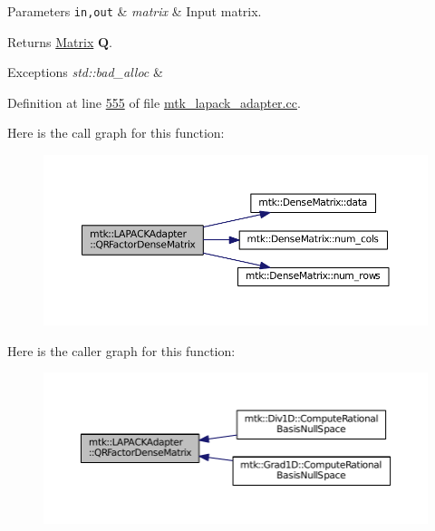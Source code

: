 \begin{DoxyParams}[1]{Parameters}
\mbox{\tt in,out}  & {\em matrix} & Input matrix.\\
\hline
\end{DoxyParams}
\begin{DoxyReturn}{Returns}
\hyperlink{classmtk_1_1Matrix}{Matrix} $ \mathbf{Q}$.
\end{DoxyReturn}

\begin{DoxyExceptions}{Exceptions}
{\em std\+::bad\+\_\+alloc} & \\
\hline
\end{DoxyExceptions}


Definition at line \hyperlink{mtk__lapack__adapter_8cc_source_l00555}{555} of file \hyperlink{mtk__lapack__adapter_8cc_source}{mtk\+\_\+lapack\+\_\+adapter.\+cc}.



Here is the call graph for this function\+:\nopagebreak
\begin{figure}[H]
\begin{center}
\leavevmode
\includegraphics[width=350pt]{classmtk_1_1LAPACKAdapter_ae5c6e78c9c819c9ac7a6f31bfd011d7a_cgraph}
\end{center}
\end{figure}




Here is the caller graph for this function\+:\nopagebreak
\begin{figure}[H]
\begin{center}
\leavevmode
\includegraphics[width=350pt]{classmtk_1_1LAPACKAdapter_ae5c6e78c9c819c9ac7a6f31bfd011d7a_icgraph}
\end{center}
\end{figure}



